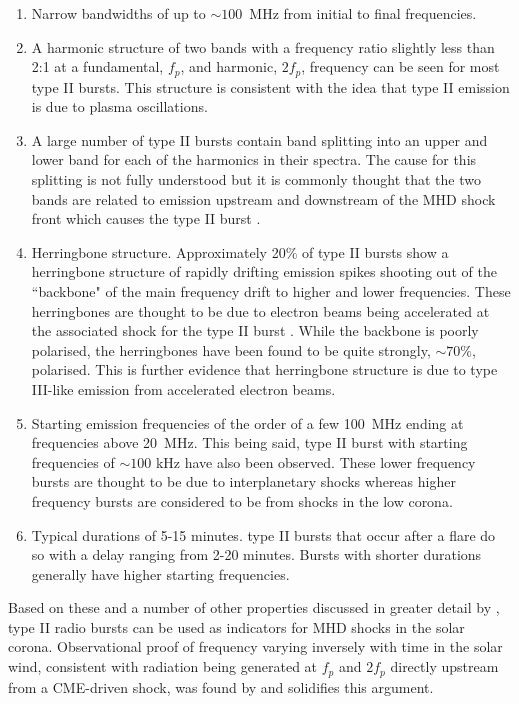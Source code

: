 \begin{enumerate}
    \item Narrow bandwidths of up to $\sim 100$~MHz from initial to final frequencies.
    \item A harmonic structure of two bands with a frequency ratio slightly less than 2:1 at a fundamental, $f_p$, and harmonic, $2f_p$, frequency can be seen for most type II bursts. This structure is consistent with the idea that type II emission is due to plasma oscillations.
    \item A large number of type II bursts contain band splitting into an upper and lower band for each of the harmonics in their spectra. The cause for this splitting is not fully understood but it is commonly thought that the two bands are related to emission upstream and downstream of the MHD shock front which causes the type II burst \citep{Smerd1974,NelsonandMelrose1985, Vrsnak2002}.
    \item Herringbone structure. Approximately 20\% of type II bursts show a herringbone structure of rapidly drifting emission spikes shooting out of the ``backbone" of the main frequency drift to higher and lower frequencies. These herringbones are thought to be due to electron beams being accelerated at the associated shock for the type II burst \citep{Mann1995}. While the backbone is poorly polarised, the herringbones have been found to be quite strongly, $\sim 70\%$, polarised. This is further evidence that herringbone structure is due to type III-like emission from accelerated electron beams.
    \item Starting emission frequencies of the order of a few 100~MHz ending at frequencies above 20~MHz. This being said, type II burst with starting frequencies of $\sim 100$ kHz have also been observed. 
    These lower frequency bursts are thought to be due to interplanetary shocks whereas higher frequency bursts are considered to be from shocks in the low corona.
    \item Typical durations of 5-15 minutes. type II bursts that occur after a flare do so with a delay ranging from 2-20 minutes. Bursts with shorter durations generally have higher starting frequencies. %
\end{enumerate}
 
Based on these and a number of other properties discussed in greater detail by \cite{NelsonandMelrose1985}, type II radio bursts can be used as indicators for MHD shocks in the solar corona. Observational proof of frequency varying inversely with time in the solar wind, consistent with radiation being generated at $f_p$ and $2f_p$ directly upstream from a CME-driven shock, was found by \cite{Reiner1997} and solidifies this argument.
